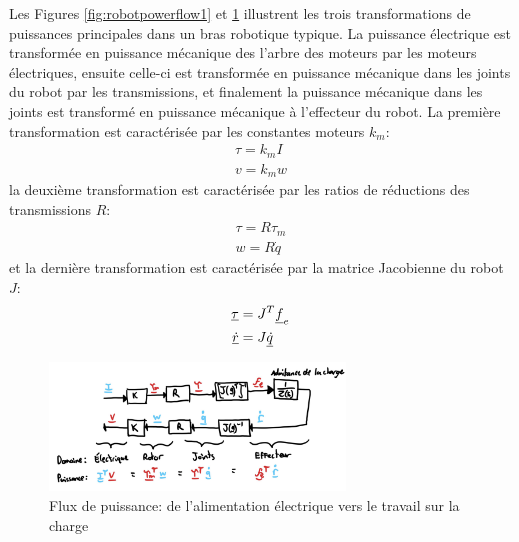 Les Figures \ref{fig:robotpowerflow1} et \ref{fig:robotpowerflow2} illustrent les trois transformations de puissances principales dans un bras robotique typique. La puissance électrique est transformée en puissance mécanique des l'arbre des moteurs par les moteurs électriques, ensuite celle-ci est transformée en puissance mécanique dans les joints du robot par les transmissions, et finalement la puissance mécanique dans les joints est transformé en puissance mécanique à l'effecteur du robot. La première transformation est caractérisée par les constantes moteurs $k_m$:
\begin{align}
\tau = k_m I \\%
v = k_m w %
\end{align}
la deuxième transformation est caractérisée par les ratios de réductions des transmissions $R$:
\begin{align}
\tau = R \tau_m \\%
w = R \dot{q} %
\end{align}
et la dernière transformation est caractérisée par la matrice Jacobienne du robot $J$:
\begin{align}
\underline{\tau} &= J^T \underline{f}_e \\
\underline{\dot{r}} &= J \underline{\dot{q}}
\end{align}

\begin{figure}[H]
	\centering
		\includegraphics[width=0.70\textwidth]{fig/robotpowerflow2.jpg}
	\caption{Flux de puissance: de l'alimentation électrique vers le travail sur la charge}
	\label{fig:robotpowerflow2}
\end{figure}





